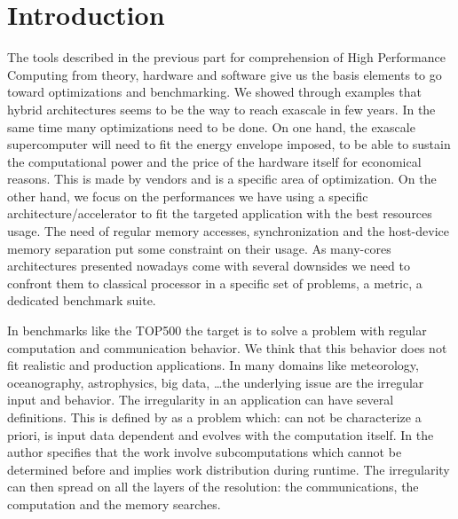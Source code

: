 
\chapter*{Introduction}

The tools described in the previous part for comprehension of High Performance Computing from theory, hardware and software give us the basis elements to go toward optimizations and benchmarking. 
We showed through examples that hybrid architectures seems to be the way to reach exascale in few years.
In the same time many optimizations need to be done.
On one hand, the exascale supercomputer will need to fit the energy envelope imposed, to be able to sustain the computational power and the price of the hardware itself for economical reasons.  
This is made by vendors and is a specific area of optimization.
On the other hand, we focus on the performances we have using a specific architecture/accelerator to fit the targeted application with the best resources usage. 
The need of regular memory accesses, synchronization and the host-device memory separation put some constraint on their usage.
As many-cores architectures presented nowadays come with several downsides we need to confront them to classical processor in a specific set of problems, a metric, a dedicated benchmark suite.

In benchmarks like the TOP500 the target is to solve a problem with regular computation and communication behavior. 
We think that this behavior does not fit realistic and production applications.
In many domains like meteorology, oceanography, astrophysics, big data, \dots the underlying issue are the irregular input and behavior.
The irregularity in an application can have several definitions. 
This is defined by \cite{javairregular} as a problem which: can not be characterize a priori, is input data dependent and evolves with the computation itself. 
In \cite{suss2006implementing} the author specifies that the work involve subcomputations which cannot be determined before and implies work distribution during runtime.
The irregularity can then spread on all the layers of the resolution:
the communications, the computation and the memory searches. 

